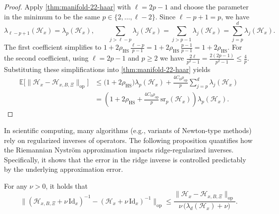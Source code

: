 \documentclass[final,onefignum,onetabnum]{siamart250211}
\begin{document}
\begin{proof}
Apply \cref{thm:manifold-22-haar} with $\ell=2p-1$ and choose the parameter in the minimum to be the same $p\in\{2,\dots,\ell-2\}$. Since $\ell-p+1=p$, we have
\[
\lambda_{\ell-p+1}(\mathcal{H}_x)=\lambda_p(\mathcal{H}_x),
\qquad
\sum_{j>\ell-p}\lambda_j(\mathcal{H}_x)=\sum_{j>p-1}\lambda_j(\mathcal{H}_x)=\sum_{j=p}^d\lambda_j(\mathcal{H}_x).
\]
The first coefficient simplifies to
$
1+2\rho_{\mathrm{HS}}\,\frac{\ell-p}{p-1}
=
1+2\rho_{\mathrm{HS}}\,\frac{p-1}{p-1}
=
1+2\rho_{\mathrm{HS}}.
$
For the second coefficient, using $\ell=2p-1$ and $p\ge 2$ we have
$
\frac{2\ell}{p^2-1}
=
\frac{2(2p-1)}{p^2-1}
\le
\frac{4}{p}.
$
Substituting these simplifications into \cref{thm:manifold-22-haar} yields
\[
\begin{aligned}
\mathbb E\big[ \|\mathcal{H}_x-\mathcal{H}_{x, B, \Xi}\|_{\mathrm{op}} \big]
&\le
\bigl(1+2\rho_{\mathrm{HS}}\bigr)\lambda_p(\mathcal{H}_x)
+\frac{4C_0\rho_{\mathrm{op}}}{p}\sum_{j=p}^d\lambda_j(\mathcal{H}_x)\\
&=
\left(1+2\rho_{\mathrm{HS}}+\frac{4C_0\rho_{\mathrm{op}}}{p}\,\mathrm{sr}_p(\mathcal{H}_x)\right)\lambda_p(\mathcal{H}_x).
\end{aligned}
\]
\end{proof}


In scientific computing, many algorithms (e.g., variants of Newton-type methods) rely on regularized inverses of operators. The following proposition quantifies how the Riemannian Nystr\"om approximation impacts ridge-regularized inverses. Specifically, it shows that the error in the ridge inverse is controlled predictably by the underlying approximation error.

\begin{proposition}
    \label{prop:manifold-31}
    For any $\nu>0$, it holds that
    \[
    \big\|( \mathcal{H}_{x, B, \Xi}+\nu \,\mathrm{Id}_x)^{-1}-(\mathcal{H}_x+\nu \,\mathrm{Id}_x)^{-1}\big\|_{\mathrm{op}}
    \le
    \frac{\|\mathcal{H}_x-\mathcal{H}_{x,B,\Xi}\|_{\mathrm{op}}}{\nu\,\bigl(\lambda_d(\mathcal{H}_x)+\nu\bigr)}.
    \]
\end{proposition}
\end{document}

